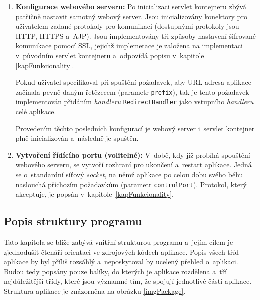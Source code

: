 \begin{enumerate}
                
                \item \textbf{Konfigurace webového serveru:} 
                    Po inicializaci servlet kontejneru zbývá patřičně nastavit 
                    samotný webový server. Jsou inicializovány konektory pro uživatelem zadané
                    protokoly pro komunikaci (dostupnými protokoly jsou HTTP, HTTPS a~AJP). 
                    Jsou implementovány tři způsoby nastavení šifrované komunikace pomocí SSL, jejichž 
                    implemetace je založena na implementaci v~původním servlet kontejneru
                    a~odpovídá popisu v~kapitole \ref{kapFunkcionality}.
                    
                    Pokud uživatel specifikoval při spuštění požadavek, 
                    aby  URL adresa aplikace začínala 
                    pevně daným řetězecem (parametr \texttt{prefix}), tak je tento požadavek implementován
                    přidáním \emph{handleru} \texttt{RedirectHandler} jako vstupního \emph{handleru}
                    celé aplikace.

                    Provedením těchto posledních konfigurací je webový server i~servlet kontejner
                    plně inicializován a~následně je spuštěn.
                
                \item \textbf{Vytvoření řídícího portu (volitelné):} 
                    V~době, kdy již probíhá spouštění webového serveru, 
                    se vytvoří rozhraní pro ukončení a~restart aplikace.
                    Jedná se o~standardní síťový \emph{socket}, na němž aplikace 
                    po celou dobu svého běhu naslouchá příchozím požadavkům (parametr \texttt{controlPort}). 
                    Protokol, který akceptuje, je popsán v~kapitole~\ref{kapFunkcionality}.

            \end{enumerate}




        \subsection{Popis struktury programu}
            Tato kapitola se blíže zabývá vnitřní strukturou programu a~jejím cílem je zjednodušit 
            čtenáři orientaci ve zdrojových kódech aplikace.
            Popis všech tříd aplikace by byl příliš rozsáhlý a~neposkytoval by ucelený přehled o~aplikaci.
            Budou tedy popsány pouze balíky, do kterých je aplikace rozdělena
            a~tří nejdůležitější třídy, které jsou významné tím, že spojují jednotlivé části aplikace.
            Struktura aplikace je znázorněna na obrázku \ref{imgPackage}.
                    
